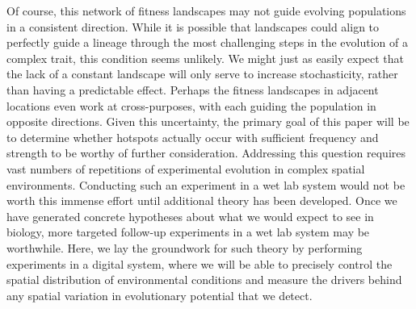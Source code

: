 Of course, this network of fitness landscapes may not guide evolving populations in a consistent direction. While it is possible that landscapes could align to perfectly guide a lineage through the most challenging steps in the evolution of a complex trait, this condition seems unlikely. We might just as easily expect that the lack of a constant landscape will only serve to increase stochasticity, rather than having a predictable effect. Perhaps the fitness landscapes in adjacent locations even work at cross-purposes, with each guiding the population in opposite directions. Given this uncertainty, the primary goal of this paper will be to determine whether hotspots actually occur with sufficient frequency and strength to be worthy of further consideration. Addressing this question requires vast numbers of repetitions of experimental evolution in complex spatial environments. Conducting such an experiment in a wet lab system would not be worth this immense effort until additional theory has been developed. Once we have generated concrete hypotheses about what we would expect to see in biology, more targeted follow-up experiments in a wet lab system may be worthwhile. Here, we lay the groundwork for such theory by performing experiments in a digital system, where we will be able to precisely control the spatial distribution of environmental conditions and measure the drivers behind any spatial variation in evolutionary potential that we detect.

